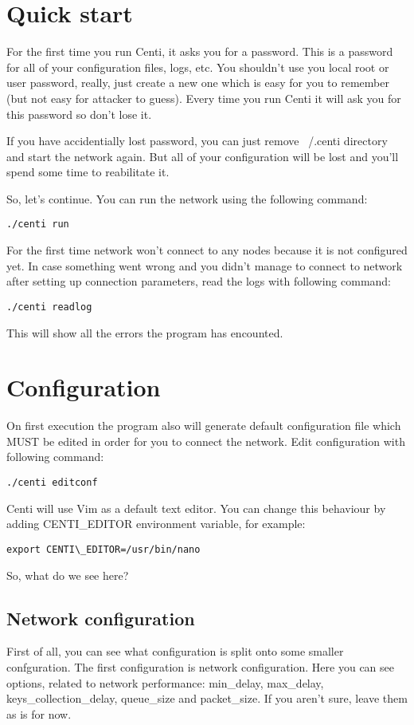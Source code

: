 \documentclass{article}
\begin{document}
\section{Quick start}

	For the first time you run Centi, it asks you for a password.
	This is a password for all of your configuration files, logs, etc.
	You shouldn't use you local root or user password, really, just
	create a new one which is easy for you to remember (but not easy for attacker to guess).
	Every time you run Centi it will ask you for this password so don't lose it.
	
	If you have accidentially lost password, you can just remove ~/.centi directory
	and start the network again. But all of your configuration will be lost and you'll
	spend some time to reabilitate it.

	So, let's continue.
	You can run the network using the following command:
	\begin{lstlisting}
./centi run
	\end{lstlisting}
	
	For the first time network won't connect to any nodes because it is not configured yet.
	In case something went wrong and you didn't manage to connect to network after setting
	up connection parameters, read the logs with following command:
	\begin{lstlisting}
./centi readlog
	\end{lstlisting}
	
	This will show all the errors the program has encounted.

\section{Configuration}
	On first execution the program also will generate default configuration file
	which MUST be edited in order for you to connect the network.
	Edit configuration with following command:
	\begin{lstlisting}
./centi editconf
	\end{lstlisting}
	
	Centi will use Vim as a default text editor. You can change this behaviour by
	adding CENTI\_EDITOR environment variable, for example:
	\begin{lstlisting}
export CENTI\_EDITOR=/usr/bin/nano
	\end{lstlisting}
	
	So, what do we see here?
	\subsection{Network configuration}
	First of all, you can see what configuration is split onto some smaller confguration.
	The first configuration is network configuration. Here you can see options,
	related to network performance: min\_delay, max\_delay, keys\_collection\_delay, queue\_size and packet\_size.
	If you aren't sure, leave them as is for now.
\end{document}
